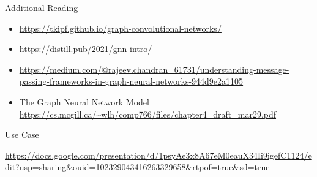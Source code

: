 \documentclass[aspectratio=169,xcolor=dvipsnames,svgnames,x11names,fleqn]{beamer}
\begin{document}
%
%
%
%
%
%


\begin{frame}{Additional Reading}

\scriptsize

\begin{itemize}
\item \url{https://tkipf.github.io/graph-convolutional-networks/}
\item \url{https://distill.pub/2021/gnn-intro/}
\item \url{https://medium.com/@rajeev.chandran_61731/understanding-message-passing-frameworks-in-graph-neural-networks-944d9e2a1105}
\item The Graph Neural Network Model \url{https://cs.mcgill.ca/~wlh/comp766/files/chapter4_draft_mar29.pdf}
\end{itemize}

\end{frame}

\begin{frame}{Use Case}


\begin{center}
\url{https://docs.google.com/presentation/d/1psyAe3x8A67eM0eauX34Ii9igefC1124/edit?usp=sharing&ouid=102329043416263329658&rtpof=true&sd=true}

\end{center}
\end{frame}
\end{document}

